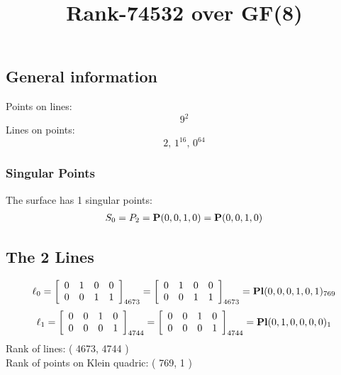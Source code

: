 \documentclass{article}
\newcommand\setTBstruts{\def\T{\rule{0pt}{2.6ex}}%
\def\B{\rule[-1.2ex]{0pt}{0pt}}}
\newcommand{\bP}{{\bf P}}
\begin{document}
 
\setTBstruts



{\allowdisplaybreaks%






\title{Rank-74532 over GF(8)}
\author{}%
\maketitle%
%
{}



\subsection*{General information}
Points on lines:
$$
9^2$$
Lines on points:
$$
2,\,1^{16},\,0^{64}$$
\subsubsection*{Singular Points}
The surface has 1 singular points:\\
\begin{align*}
S_{0} &= P_{2}=\bP(0, 0, 1, 0) = \bP(0, 0, 1, 0)\\
\end{align*}
\subsection*{The 2 Lines}
$$
\ell_{0} = 
\left[
\begin{array}{*{4}{r}}
0 & 1 & 0 & 0\\
0 & 0 & 1 & 1\\
\end{array}
\right]
_{4673}
=
\left[
\begin{array}{*{4}c}
0  & 1  & 0  & 0\\
0  & 0  & 1  & 1\\
\end{array}
\right]_{4673}
={\rm\bf Pl}(0,0,0,1,0,1 )_{769}$$
$$
\ell_{1} = 
\left[
\begin{array}{*{4}{r}}
0 & 0 & 1 & 0\\
0 & 0 & 0 & 1\\
\end{array}
\right]
_{4744}
=
\left[
\begin{array}{*{4}c}
0  & 0  & 1  & 0\\
0  & 0  & 0  & 1\\
\end{array}
\right]_{4744}
={\rm\bf Pl}(0,1,0,0,0,0 )_{1}$$
Rank of lines: ( 4673, 4744 )\\
Rank of points on Klein quadric: ( 769, 1 )\\
}
\end{document}
